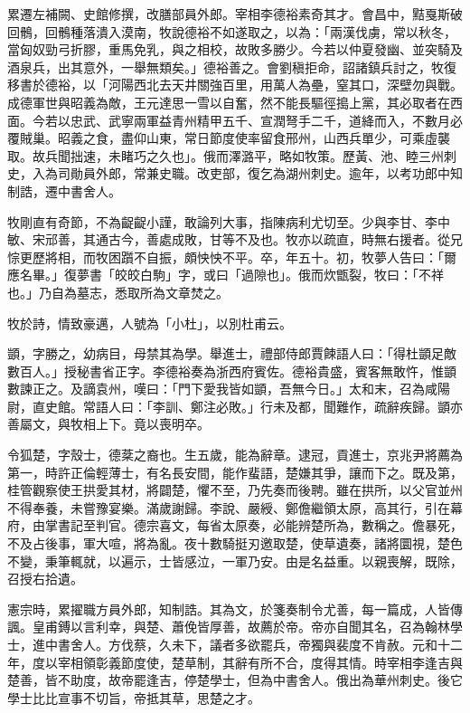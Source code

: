 \begin{pinyinscope}
 累遷左補闕、史館修撰，改膳部員外郎。宰相李德裕素奇其才。會昌中，黠戛斯破回鶻，回鶻種落潰入漠南，牧說德裕不如遂取之，以為：「兩漢伐虜，常以秋冬，當匈奴勁弓折膠，重馬免乳，與之相校，故敗多勝少。今若以仲夏發幽、並突騎及酒泉兵，出其意外，一舉無類矣。」德裕善之。會劉稹拒命，詔諸鎮兵討之，牧復移書於德裕，以「河陽西北去天井關強百里，用萬人為壘，窒其口，深壁勿與戰。成德軍世與昭義為敵，王元達思一雪以自奮，然不能長驅徑搗上黨，其必取者在西面。今若以忠武、武寧兩軍益青州精甲五千、宣潤弩手二千，道絳而入，不數月必覆賊巢。昭義之食，盡仰山東，常日節度使率留食邢州，山西兵單少，可乘虛襲取。故兵聞拙速，未睹巧之久也」。俄而澤潞平，略如牧策。歷黃、池、睦三州刺史，入為司勛員外郎，常兼史職。改吏部，復乞為湖州刺史。逾年，以考功郎中知制誥，遷中書舍人。



 牧剛直有奇節，不為齪齪小謹，敢論列大事，指陳病利尤切至。少與李甘、李中敏、宋邧善，其通古今，善處成敗，甘等不及也。牧亦以疏直，時無右援者。從兄悰更歷將相，而牧困躓不自振，頗怏怏不平。卒，年五十。初，牧夢人告曰：「爾應名畢。」復夢書「皎皎白駒」字，或曰「過隙也」。俄而炊甑裂，牧曰：「不祥也。」乃自為墓志，悉取所為文章焚之。



 牧於詩，情致豪邁，人號為「小杜」，以別杜甫云。



 顗，字勝之，幼病目，母禁其為學。舉進士，禮部侍郎賈餗語人曰：「得杜顗足敵數百人。」授秘書省正字。李德裕奏為浙西府賓佐。德裕貴盛，賓客無敢忤，惟顗數諫正之。及謫袁州，嘆曰：「門下愛我皆如顗，吾無今日。」太和末，召為咸陽尉，直史館。常語人曰：「李訓、鄭注必敗。」行未及都，聞難作，疏辭疾歸。顗亦善屬文，與牧相上下。竟以喪明卒。



 令狐楚，字殼士，德棻之裔也。生五歲，能為辭章。逮冠，貢進士，京兆尹將薦為第一，時許正倫輕薄士，有名長安間，能作蜚語，楚嫌其爭，讓而下之。既及第，桂管觀察使王拱愛其材，將闢楚，懼不至，乃先奏而後聘。雖在拱所，以父官並州不得奉養，未嘗豫宴樂。滿歲謝歸。李說、嚴綬、鄭儋繼領太原，高其行，引在幕府，由掌書記至判官。德宗喜文，每省太原奏，必能辨楚所為，數稱之。儋暴死，不及占後事，軍大喧，將為亂。夜十數騎挺刃邀取楚，使草遺奏，諸將圜視，楚色不變，秉筆輒就，以遍示，士皆感泣，一軍乃安。由是名益重。以親喪解，既除，召授右拾遺。



 憲宗時，累擢職方員外郎，知制誥。其為文，於箋奏制令尤善，每一篇成，人皆傳諷。皇甫鎛以言利幸，與楚、蕭俛皆厚善，故薦於帝。帝亦自聞其名，召為翰林學士，進中書舍人。方伐蔡，久未下，議者多欲罷兵，帝獨與裴度不肯赦。元和十二年，度以宰相領彰義節度使，楚草制，其辭有所不合，度得其情。時宰相李逢吉與楚善，皆不助度，故帝罷逢吉，停楚學士，但為中書舍人。俄出為華州刺史。後它學士比比宣事不切旨，帝抵其草，思楚之才。




\end{pinyinscope}
